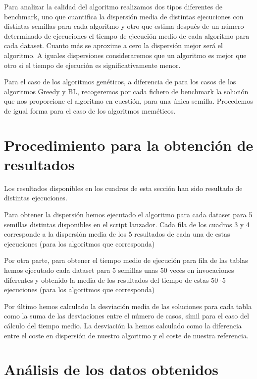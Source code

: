 Para analizar la calidad del algoritmo realizamos dos tipos diferentes de benchmark, uno que cuantifica la dispersión
media de distintas ejecuciones con distintas semillas para cada algoritmo y otro que estima después de un número
determinado de ejecuciones el tiempo de ejecución medio de cada algoritmo para cada dataset. Cuanto más se aproxime
a cero la dispersión mejor será el algoritmo. A iguales dispersiones consideraremos que un algoritmo es mejor que otro
si el tiempo de ejecución es significativamente menor.

Para el caso de los algoritmos genéticos, a diferencia de para los casos de los algoritmos Greedy y BL, recogeremos 
por cada fichero de benchmark la solución que nos proporcione el algoritmo en cuestión, para una única semilla. Procedemos
de igual forma para el caso de los algoritmos meméticos.

\section{Procedimiento para la obtención de resultados}

Los resultados disponibles en los cuadros de esta sección han sido resultado de distintas ejecuciones.

Para obtener la dispersión hemos ejecutado el algoritmo para cada dataset para 5 semillas distintas disponibles
en el script lanzador. Cada fila de los cuadros 3 y 4 corresponde a la dispersión media de los 5 resultados de cada
una de estas ejecuciones (para los algoritmos que corresponda)

Por otra parte, para obtener el tiempo medio de ejecución para fila de las tablas hemos ejecutado cada dataset
para 5 semillas unas 50 veces en invocaciones diferentes y obtenido la media de los resultados del tiempo de estas
$ 50 \cdot 5 $ ejecuciones (para los algoritmos que corresponda)

Por último hemos calculado la desviación media de las soluciones para cada tabla como la suma de las desviaciones
entre el número de casos, símil para el caso del cálculo del tiempo medio. La desviación la hemos calculado como la
diferencia entre el coste en dispersión de nuestro algoritmo y el coste de nuestra referencia.



\section{Análisis de los datos obtenidos}

